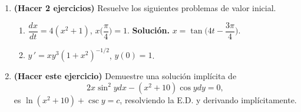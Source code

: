 \documentclass[letterpaper,10pt]{memoir}
\begin{document}
\begin{enumerate}
	\item \textbf{(Hacer 2 ejercicios)} Resuelve los siguientes problemas de valor inicial.
		\begin{enumerate}
			\item \(\dfrac{dx}{dt}= 4(x^2+1)\), \(x \Bigg(\dfrac{\pi}{4}\Bigg) =1\). \textbf{Solución.} \(x= \tan \Bigg(4t- \dfrac{3 \pi}{4}\Bigg)\).
			\item \(y \,' =xy^3(1+x^2) ^{-1/2}\), \(y(0) =1\).
		\end{enumerate}
	\item \textbf{(Hacer este ejercicio)} Demuestre una solución implícita de
		\[
			2x \sin ^2ydx-(x^2+10) \cos ydy=0,
		\]
		es \(\ln (x^2+10) + \csc y=c\), resolviendo la E.D. y derivando implícitamente.
\end{enumerate}
\end{document}
